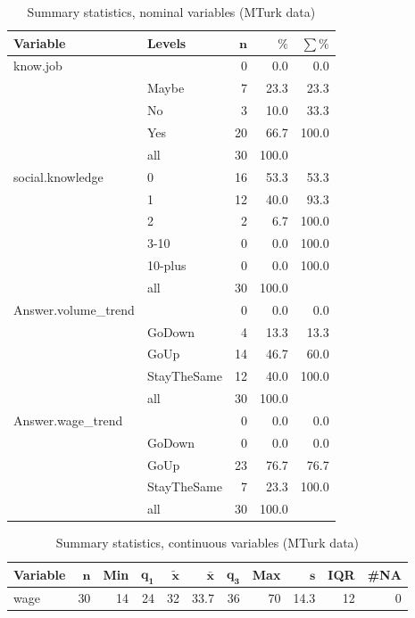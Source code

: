 \documentclass[a4paper,10pt]{article}\usepackage[]{graphicx}\usepackage[]{color}
\begin{document}
\begin{table}[ht]
\centering
{\footnotesize
\begin{tabular}{ll|rrr}
 \textbf{Variable} & \textbf{Levels} & $\mathbf{n}$ & $\mathbf{\%}$ & $\mathbf{\sum \%}$ \\ 
  \hline
know.job &  & 0 & 0.0 & 0.0 \\ 
   & Maybe & 7 & 23.3 & 23.3 \\ 
   & No & 3 & 10.0 & 33.3 \\ 
   & Yes & 20 & 66.7 & 100.0 \\ 
   \hline
 & all & 30 & 100.0 &  \\ 
   \hline
\hline
social.knowledge & 0 & 16 & 53.3 & 53.3 \\ 
   & 1 & 12 & 40.0 & 93.3 \\ 
   & 2 & 2 & 6.7 & 100.0 \\ 
   & 3-10 & 0 & 0.0 & 100.0 \\ 
   & 10-plus & 0 & 0.0 & 100.0 \\ 
   \hline
 & all & 30 & 100.0 &  \\ 
   \hline
\hline
Answer.volume\_trend &  & 0 & 0.0 & 0.0 \\ 
   & GoDown & 4 & 13.3 & 13.3 \\ 
   & GoUp & 14 & 46.7 & 60.0 \\ 
   & StayTheSame & 12 & 40.0 & 100.0 \\ 
   \hline
 & all & 30 & 100.0 &  \\ 
   \hline
\hline
Answer.wage\_trend &  & 0 & 0.0 & 0.0 \\ 
   & GoDown & 0 & 0.0 & 0.0 \\ 
   & GoUp & 23 & 76.7 & 76.7 \\ 
   & StayTheSame & 7 & 23.3 & 100.0 \\ 
   \hline
 & all & 30 & 100.0 &  \\ 
   \hline
\hline
\end{tabular}
}
\caption{Summary statistics, nominal variables (MTurk data)} 
\label{tab1:11-3030}
\end{table}
\begin{table}[ht]
\centering
{\footnotesize
\begin{tabular}{lrrrrrrrrrr}
 \textbf{Variable} & $\mathbf{n}$ & \textbf{Min} & $\mathbf{q_1}$ & $\mathbf{\widetilde{x}}$ & $\mathbf{\bar{x}}$ & $\mathbf{q_3}$ & \textbf{Max} & $\mathbf{s}$ & \textbf{IQR} & \textbf{\#NA} \\ 
  \hline
wage & 30 & 14 & 24 & 32 & 33.7 & 36 & 70 & 14.3 & 12 & 0 \\ 
  \end{tabular}
}
\caption{Summary statistics, continuous variables (MTurk data)} 
\label{tab2:11-3030}
\end{table}
\end{document}

